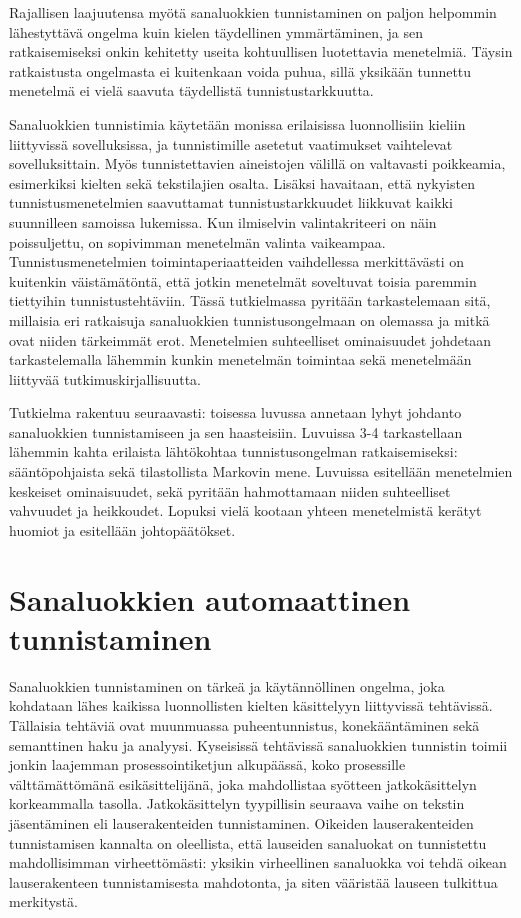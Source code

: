 \documentclass[utf8,bachelor,manualbib]{gradu3}
\begin{document}
Rajallisen laajuutensa myötä sanaluokkien tunnistaminen on paljon helpommin lähestyttävä ongelma kuin kielen täydellinen ymmärtäminen, ja sen ratkaisemiseksi onkin kehitetty useita kohtuullisen luotettavia menetelmiä. Täysin ratkaistusta ongelmasta ei kuitenkaan voida puhua, sillä yksikään tunnettu menetelmä ei vielä saavuta täydellistä tunnistustarkkuutta. \citep[s. 342]{manning1999}

Sanaluokkien tunnistimia käytetään monissa erilaisissa luonnollisiin kieliin liittyvissä sovelluksissa, ja tunnistimille asetetut vaatimukset vaihtelevat sovelluksittain. Myös tunnistettavien aineistojen välillä on valtavasti poikkeamia, esimerkiksi kielten sekä tekstilajien osalta. Lisäksi havaitaan, että nykyisten tunnistusmenetelmien saavuttamat tunnistustarkkuudet liikkuvat kaikki suunnilleen samoissa lukemissa. Kun ilmiselvin valintakriteeri on näin poissuljettu, on sopivimman menetelmän valinta vaikeampaa. Tunnistusmenetelmien toimintaperiaatteiden vaihdellessa merkittävästi on kuitenkin väistämätöntä, että jotkin menetelmät soveltuvat toisia paremmin tiettyihin tunnistustehtäviin. Tässä tutkielmassa pyritään tarkastelemaan sitä, millaisia eri ratkaisuja sanaluokkien tunnistusongelmaan on olemassa ja mitkä ovat niiden tärkeimmät erot. Menetelmien suhteelliset ominaisuudet johdetaan tarkastelemalla lähemmin kunkin menetelmän toimintaa sekä menetelmään liittyvää tutkimuskirjallisuutta. 

Tutkielma rakentuu seuraavasti: toisessa luvussa annetaan lyhyt johdanto sanaluokkien tunnistamiseen ja sen haasteisiin. Luvuissa 3-4 tarkastellaan lähemmin kahta erilaista lähtökohtaa tunnistusongelman ratkaisemiseksi: sääntöpohjaista sekä tilastollista Markovin mene. Luvuissa esitellään menetelmien keskeiset ominaisuudet, sekä pyritään hahmottamaan niiden suhteelliset vahvuudet ja heikkoudet. Lopuksi vielä kootaan yhteen menetelmistä kerätyt huomiot ja esitellään johtopäätökset.

\chapter{Sanaluokkien automaattinen tunnistaminen}

Sanaluokkien tunnistaminen on tärkeä ja käytännöllinen ongelma, joka kohdataan lähes kaikissa luonnollisten kielten käsittelyyn liittyvissä tehtävissä. Tällaisia tehtäviä ovat muunmuassa puheentunnistus, konekääntäminen sekä semanttinen haku ja analyysi. Kyseisissä tehtävissä sanaluokkien tunnistin toimii jonkin laajemman prosessointiketjun alkupäässä, koko prosessille välttämättömänä esikäsittelijänä, joka mahdollistaa syötteen jatkokäsittelyn korkeammalla tasolla. Jatkokäsittelyn tyypillisin seuraava vaihe on tekstin jäsentäminen eli lauserakenteiden tunnistaminen. Oikeiden lauserakenteiden tunnistamisen kannalta on oleellista, että lauseiden sanaluokat on tunnistettu mahdollisimman virheettömästi: yksikin virheellinen sanaluokka voi tehdä oikean lauserakenteen tunnistamisesta mahdotonta, ja siten vääristää lauseen tulkittua merkitystä.
\end{document}
